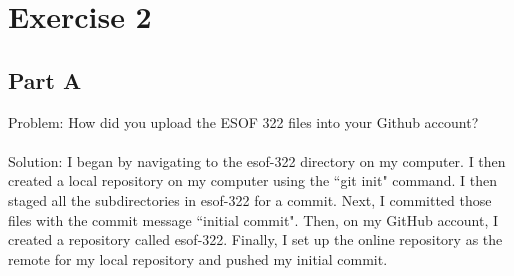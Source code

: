 \documentclass{article}
\begin{document}
\newpage

\section*{Exercise 2}

\subsection*{Part A}
Problem: How did you upload the ESOF 322 files into your Github account? \\\\
Solution: I began by navigating to the esof-322 directory on my computer. I then created a local repository on my computer using the ``git init" command. 
I then staged all the subdirectories in esof-322 for a commit. Next, I committed those files with the commit message ``initial commit".
Then, on my GitHub account, I created a repository called esof-322.
Finally, I set up the online repository as the remote for my local repository and pushed my initial commit.
\end{document}
